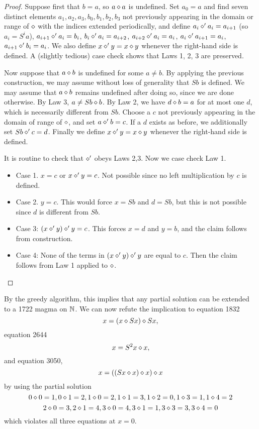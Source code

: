 \begin{proof}  Suppose first that $b=a$, so $a \diamond a$ is undefined. Set $a_0=a$ and find seven distinct elements $a_1,a_2,a_3,b_0,b_1,b_2,b_3$ not previously appearing in the domain or range of $\diamond$ with the indices extended periodically, and define $a_i \diamond' a_i = a_{i+1}$ (so $a_i = S^i a$), $a_{i+1} \diamond' a_i = b_i$, $b_i \diamond' a_i = a_{i+2}$, $a_{i+2} \diamond' a_i = a_i$, $a_i \diamond' a_{i+1} = a_i$, $a_{i+1} \diamond' b_i = a_i$.  We also define $x \diamond' y = x \diamond y$ whenever the right-hand side is defined. A (slightly tedious) case check shows that Laws 1, 2, 3 are preserved.

Now suppose that $a \diamond b$ is undefined for some $a \neq b$.  By applying the previous construction, we may assume without loss of generality that $Sb$ is defined.  We may assume that $a \diamond b$ remains undefined after doing so, since we are done otherwise.  By Law 3, $a \neq Sb \diamond b$.  By Law 2, we have $d \diamond b = a$ for at most one $d$, which is necessarily different from $Sb$.  Choose a $c$ not previously appearing in the domain of range of $\diamond$, and set $a \diamond' b = c$.  If a $d$ exists as before, we additionally set $Sb \diamond' c = d$.  Finally we define $x \diamond' y = x \diamond y$ whenever the right-hand side is defined.

It is routine to check that $\diamond'$ obeys Laws 2,3.  Now we case check Law 1.

\begin{itemize}
\item Case 1.  $x=c$ or $x \diamond' y = c$.  Not possible since no left multiplication by $c$ is defined.
\item Case 2.  $y=c$.  This would force $x = Sb$ and $d = Sb$, but this is not possible since $d$ is different from $Sb$.
\item Case 3: $(x \diamond' y) \diamond' y = c$. This forces $x=d$ and $y=b$, and the claim follows from construction.
\item Case 4: None of the terms in $(x \diamond' y) \diamond' y$ are equal to $c$.  Then the claim follows from Law 1 applied to $\diamond$.
\end{itemize}
\end{proof}

By the greedy algorithm, this implies that any partial solution can be extended to a 1722 magma on $\mathbb{N}$.  We can now refute the implication to equation 1832
$$ x = (x \diamond Sx) \diamond Sx,$$
equation 2644
$$ x = S^2 x \diamond x,$$
and equation 3050,
$$ x = ((Sx \diamond x) \diamond x) \diamond x$$
by using the partial solution
$$ 0 \diamond 0 = 1, 0 \diamond 1 = 2, 1 \diamond 0 = 2, 1 \diamond 1 = 3, 1 \diamond 2 = 0, 1 \diamond 3 = 1, 1 \diamond 4 = 2$$
$$ 2 \diamond 0 = 3, 2 \diamond 1 = 4, 3 \diamond 0 = 4, 3 \diamond 1 = 1, 3 \diamond 3 = 3, 3 \diamond 4 = 0$$
which violates all three equations at $x=0$.

